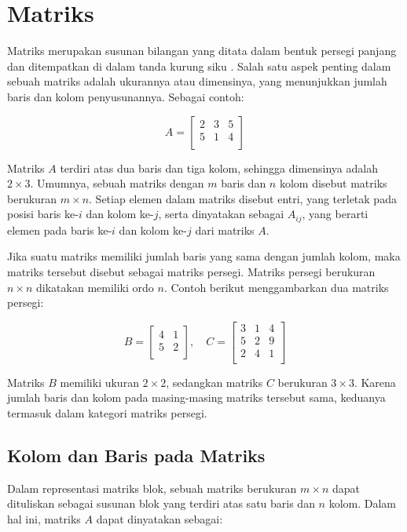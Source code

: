 \documentclass[a4paper,12pt]{report}
\numberwithin{equation}{chapter}
\begin{document}
\section{Matriks}
Matriks merupakan susunan bilangan yang ditata dalam bentuk persegi panjang dan ditempatkan di dalam tanda kurung siku \citep{Boyd2018IntroductionAlgebra}. Salah satu aspek penting dalam sebuah matriks adalah ukurannya atau dimensinya, yang menunjukkan jumlah baris dan kolom penyusunannya. Sebagai contoh:

\[
A = \begin{bmatrix}
2&3&5\\
5&1&4\\
\end{bmatrix}
\]

Matriks $A$ terdiri atas dua baris dan tiga kolom, sehingga dimensinya adalah $2 \times 3$. Umumnya, sebuah matriks dengan $m$ baris dan $n$ kolom disebut matriks berukuran $m \times n$. Setiap elemen dalam matriks disebut entri, yang terletak pada posisi baris ke-$i$ dan kolom ke-$j$, serta dinyatakan sebagai $A_{ij}$, yang berarti elemen pada baris ke-$i$ dan kolom ke-$j$ dari matriks $A$.

Jika suatu matriks memiliki jumlah baris yang sama dengan jumlah kolom, maka matriks tersebut disebut sebagai matriks persegi. Matriks persegi berukuran $n \times n$ dikatakan memiliki ordo $n$. Contoh berikut menggambarkan dua matriks persegi:

\[
B = \begin{bmatrix}
4 & 1 \\
5 & 2 \\
\end{bmatrix}
,\quad
C = \begin{bmatrix}
3 & 1 & 4 \\
5 & 2 & 9 \\
2 & 4 & 1 \\
\end{bmatrix}
\]

Matriks $B$ memiliki ukuran $2 \times 2$, sedangkan matriks $C$ berukuran $3 \times 3$. Karena jumlah baris dan kolom pada masing-masing matriks tersebut sama, keduanya termasuk dalam kategori matriks persegi.

\subsection{Kolom dan Baris pada Matriks}
Dalam representasi matriks blok, sebuah matriks berukuran $m \times n$ dapat dituliskan sebagai susunan blok yang terdiri atas satu baris dan $n$ kolom. Dalam hal ini, matriks $A$ dapat dinyatakan sebagai:
\end{document}
